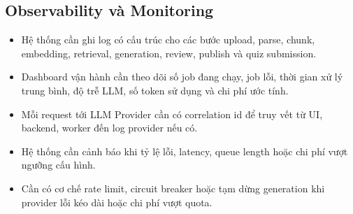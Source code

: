 \subsection{Observability và Monitoring}
\label{subsec:observability-monitoring}

\begin{itemize}
    \item Hệ thống cần ghi log có cấu trúc cho các bước upload, parse, chunk,
          embedding, retrieval, generation, review, publish và quiz submission.
    \item Dashboard vận hành cần theo dõi số job đang chạy, job lỗi, thời gian
          xử lý trung bình, độ trễ LLM, số token sử dụng và chi phí ước tính.
    \item Mỗi request tới LLM Provider cần có correlation id để truy vết từ UI,
          backend, worker đến log provider nếu có.
    \item Hệ thống cần cảnh báo khi tỷ lệ lỗi, latency, queue length hoặc chi
          phí vượt ngưỡng cấu hình.
    \item Cần có cơ chế rate limit, circuit breaker hoặc tạm dừng generation
          khi provider lỗi kéo dài hoặc chi phí vượt quota.
\end{itemize}
